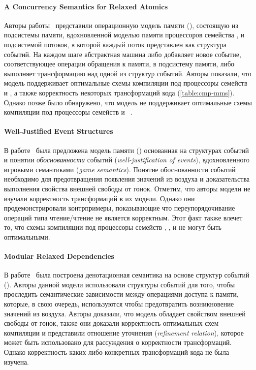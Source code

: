 \paragraph{A Concurrency Semantics for Relaxed Atomics}

Авторы работы~\cite{PichonPharabod-Sewell:POPL16} 
представили операционную модель памяти (\CSRA),
состоящую из подсистемы памяти, вдохновленной моделью памяти 
процессоров семейства \POWER, 
и подсистемой потоков, в которой каждый поток 
представлен как структура событий. 
На каждом шаге абстрактная машина либо 
добавляет новое событие, соответствующее операции обращения к памяти, 
в подсистему памяти, либо выполняет трансформацию 
над одной из структур событий. 
Авторы показали, что модель поддерживает оптимальные 
схемы компиляции под процессоры семейств \Intel и \POWER,
а также корректность некоторых трансформаций кода
(\see \cref{table:cmp-mms}). 
Однако позже было обнаружено, что 
модель не поддерживает оптимальные схемы компиляции
под процессоры семейств  и ~\cite{PichonPharabod:PhD18}.

\paragraph{Well-Justified Event Structures}

В работе~\cite{Jeffrey-Riely:LICS16} была предложена модель памяти (\WJES)
основанная на структурах событий и понятии 
\emph{обоснованности} событий (\emph{well-justification of events}), 
вдохновленного игровыми семантиками (\emph{game semantics}).
Понятие обоснованности событий необходимо для 
предотвращения появления значений из воздуха и 
доказательства выполнения свойства внешней свободы от гонок. 
Отметим, что авторы модели не изучали корректность трансформаций 
в их модели. Однако они продемонстрировали контрпримеры, 
показывающие что переупорядочивание операций типа чтение/чтение 
не является корректным. 
Этот факт также влечет то, что схемы компиляции 
под процессоры семейств , , и \POWER 
не могут быть оптимальными. 

\paragraph{Modular Relaxed Dependencies}

В работе~\cite{Paviotti-al:ESOP20} была построена 
денотационная семантика на основе структур событий (\MRD). 
Авторы данной модели использовали структуры событий 
для того, чтобы проследить семантические зависимости
между операциями доступа к памяти, 
которые, в свою очередь, используются 
чтобы предотвратить возникновение значений из воздуха. 
Авторы доказали, что модель обладает свойством внешней свободы от гонок,
также они доказали корректность оптимальных схем компиляции
и представили отношение уточнения (\emph{refinement relation}), 
которое может быть использовано для рассуждения о корректности трансформаций. 
Однако корректность каких-либо конкретных трансформаций кода не была изучена.

